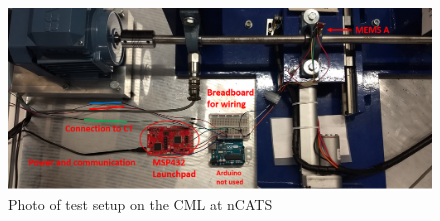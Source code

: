 \begin{figure}
    \centering
    \includegraphics[width=\linewidth]{Images/EmbeddedCMS_Notes.png}
    \caption{Photo of test setup on the CML at nCATS}
    \label{fig:EmbeddedCMS}
\end{figure}

